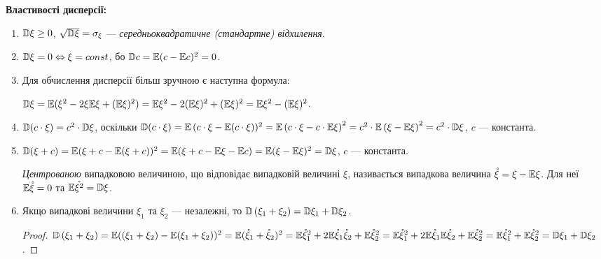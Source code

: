 \noindent \textbf{Властивості дисперсії:}
\begin{enumerate}
    \item $\mathbb{D}\xi \geq 0$, $\sqrt{\mathbb{D}\xi} = \sigma_\xi$ --- \emph{середньоквадратичне (стандартне) відхилення}.
    \item $\mathbb{D}\xi = 0 \Leftrightarrow \xi = const$, бо $\mathbb{D} c = \mathbb{E}(c - \mathbb{E} c)^2 = 0$.
    \item Для обчислення дисперсії більш зручною є наступна формула:

    $\mathbb{D}\xi = \mathbb{E}(\xi^2 - 2\xi \mathbb{E}\xi +(\mathbb{E}\xi)^2) = \mathbb{E}\xi^2 - 2(\mathbb{E}\xi)^2 + (\mathbb{E}\xi)^2 = \mathbb{E}\xi^2 - (\mathbb{E}\xi)^2$. 
    \item $\mathbb{D}(c\cdot \xi) = c^2\cdot \mathbb{D}\xi$, оскільки $\mathbb{D}(c\cdot \xi) = \mathbb{E}\left(c\cdot\xi-\mathbb{E}(c\cdot\xi\right))^2 = \mathbb{E}\left(c\cdot\xi - c\cdot \mathbb{E}\xi\right)^2 = c^2 \cdot \mathbb{E}\left(\xi-\mathbb{E}\xi\right)^2 = c^2 \cdot \mathbb{D}\xi$, $c$ --- константа.
    \item $\mathbb{D}(\xi + c) = \mathbb{E}(\xi + c - \mathbb{E}(\xi + c))^2 = \mathbb{E}(\xi + c - \mathbb{E}\xi - \mathbb{E} c) = \mathbb{E}(\xi - \mathbb{E}\xi)^2 = \mathbb{D}\xi$, $c$ --- константа.
\begin{definition}
    \emph{Центрованою} випадковою величиною, що відповідає випадковій величині $\xi$, називається 
    випадкова величина $\mathring{\xi} = \xi - \mathbb{E}\xi$. Для неї $\mathbb{E}\mathring{\xi} = 0$ та 
    $\mathbb{E}\mathring{\xi^2} = \mathbb{D}\xi$.
\end{definition}
    \item Якщо випадкові величини $\xi_1$ та $\xi_2$ --- незалежні, то
    $\mathbb{D}\left(\xi_1 + \xi_2\right) = \mathbb{D}\xi_1 + \mathbb{D}\xi_2$.
    \begin{proof}
        $\mathbb{D}\left(\xi_1 + \xi_2\right) = \mathbb{E}((\xi_1 + \xi_2) - \mathbb{E}(\xi_1 + \xi_2))^2 = \mathbb{E}(\mathring{\xi}_1 + \mathring{\xi}_2)^2 =
        \mathbb{E}\mathring{\xi}_1^2 + 2\mathbb{E}\mathring{\xi}_1\mathring{\xi}_2 + \mathbb{E}\mathring{\xi}_2^2 = 
        \mathbb{E}\mathring{\xi}_1^2 + 2\mathbb{E}\mathring{\xi}_1 \mathbb{E}\mathring{\xi}_2 + \mathbb{E}\mathring{\xi}_2^2 =
        \mathbb{E}\mathring{\xi}_1^2 + \mathbb{E}\mathring{\xi}_2^2 = \mathbb{D}\xi_1 + \mathbb{D}\xi_2$.
    \end{proof}
\end{enumerate}

